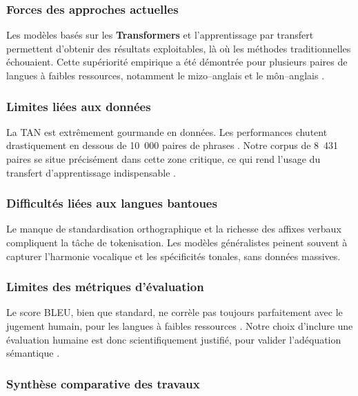 \subsubsection{Forces des approches actuelles}

Les modèles basés sur les \textbf{Transformers} et l'apprentissage par transfert permettent d'obtenir des résultats exploitables, là où les méthodes traditionnelles échouaient. Cette supériorité empirique a été démontrée pour plusieurs paires de langues à faibles ressources, notamment le mizo--anglais \cite{lalrempuii2021improved} et le môn--anglais \cite{tun2025exploring}.

\subsubsection{Limites liées aux données}

La \ac{TAN} est extrêmement gourmande en données. Les performances chutent drastiquement en dessous de 10~000 paires de phrases \cite{ranathunga2023neural}. Notre corpus de 8~431 paires se situe précisément dans cette zone critique, ce qui rend l'usage du transfert d'apprentissage indispensable \cite{ma2025dongba}.

\subsubsection{Difficultés liées aux langues bantoues}

Le manque de standardisation orthographique et la richesse des affixes verbaux compliquent la tâche de tokenisation. Les modèles généralistes peinent souvent à capturer l'harmonie vocalique et les spécificités tonales, sans données massives.

\subsubsection{Limites des métriques d'évaluation}

Le score \ac{BLEU}, bien que standard, ne corrèle pas toujours parfaitement avec le jugement humain, pour les langues à faibles ressources \cite{lankford2022human, lalrempuii2021improved}. Notre choix d'inclure une évaluation humaine est donc scientifiquement justifié, pour valider l'adéquation sémantique \cite{tun2025exploring}.

\subsubsection{Synthèse comparative des travaux}

